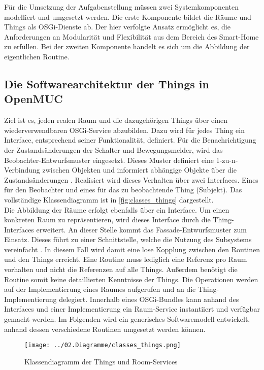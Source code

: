 Für die Umsetzung der Aufgabenstellung müssen zwei Systemkomponenten modelliert und umgesetzt werden.
Die erste Komponente bildet die Räume und Things als \ac{OSGi}-Dienste ab.
Der hier verfolgte Ansatz ermöglicht es, die Anforderungen an Modularität und Flexibilität aus dem Bereich des Smart-Home zu erfüllen.
Bei der zweiten Komponente handelt es sich um die Abbildung der eigentlichen Routine.

\subsection{Die Softwarearchitektur der Things in OpenMUC}
\label{subsec:sw_things}

Ziel ist es, jeden realen Raum und die dazugehörigen Things über einen wiederverwendbaren \ac{OSGi}-Service abzubilden.
Dazu wird für jedes Thing ein Interface, entsprechend seiner Funktionalität, definiert. 
Für die Benachrichtigung der Zustandsänderungen der Schalter und Bewegungsmelder, wird das Beobachter-Entwurfsmuster eingesetzt.
Dieses Muster definiert eine 1-zu-n-Verbindung zwischen Objekten und informiert abhängige Objekte über die Zustandsänderungen \cite{gof}.
Realisiert wird dieses Verhalten über zwei Interfaces. Eines für den Beobachter und eines für das zu beobachtende Thing (Subjekt).
Das vollständige Klassendiagramm ist in \autoref{fig:classes_things} dargestellt.\\

Die Abbildung der Räume erfolgt ebenfalls über ein Interface.
Um einen konkreten Raum zu repräsentieren, wird dieses Interface durch die Thing-Interfaces erweitert.
An dieser Stelle kommt das Fassade-Entwurfsmuster zum Einsatz. Dieses führt zu einer Schnittstelle, welche die Nutzung des Subsystems vereinfacht \cite{gof}.
In diesem Fall wird damit eine lose Kopplung zwischen den Routinen und den Things erreicht.
Eine Routine muss lediglich eine Referenz pro Raum vorhalten und nicht die Referenzen auf alle Things.
Außerdem benötigt die Routine somit keine detaillierten Kenntnisse der Things.
Die Operationen werden auf der Implementierung eines Raumes aufgerufen und an die Thing-Implementierung delegiert.
Innerhalb eines \ac{OSGi}-Bundles kann anhand des Interfaces und einer Implementierung ein Raum-Service instantiiert und verfügbar gemacht werden.
Im Folgenden wird ein generisches Softwaremodell entwickelt, anhand dessen verschiedene Routinen umgesetzt werden können.\\

\begin{figure}[H]
 \centering
 \texttt{[image: ../02.Diagramme/classes\_things.png]}
 \caption{Klassendiagramm der Things und Room-Services}
 \label{fig:classes_things}
\end{figure}

